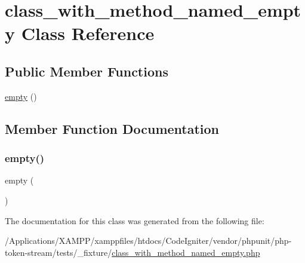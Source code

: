 \hypertarget{classclass__with__method__named__empty}{}\section{class\+\_\+with\+\_\+method\+\_\+named\+\_\+empty Class Reference}
\label{classclass__with__method__named__empty}
\subsection*{Public Member Functions}
\begin{DoxyCompactItemize}
\item 
\mbox{\hyperlink{classclass__with__method__named__empty_a15293e929a98c92f011d6cef446df6de}{empty}} ()
\end{DoxyCompactItemize}


\subsection{Member Function Documentation}
\mbox{\label{classclass__with__method__named__empty_a15293e929a98c92f011d6cef446df6de}} 
\subsubsection{\texorpdfstring{empty()}{empty()}}
{\footnotesize\ttfamily empty (\begin{DoxyParamCaption}{ }\end{DoxyParamCaption})}



The documentation for this class was generated from the following file\+:\begin{DoxyCompactItemize}
\item 
/\+Applications/\+X\+A\+M\+P\+P/xamppfiles/htdocs/\+Code\+Igniter/vendor/phpunit/php-\/token-\/stream/tests/\+\_\+fixture/\mbox{\hyperlink{class__with__method__named__empty_8php}{class\+\_\+with\+\_\+method\+\_\+named\+\_\+empty.\+php}}\end{DoxyCompactItemize}
